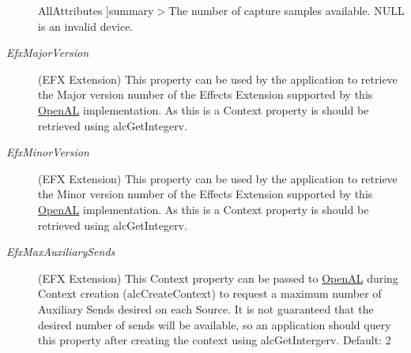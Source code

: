 \begin{Desc}
\begin{description}
{\hypertarget{namespace_open_t_k_1_1_audio_1_1_open_a_l_ae26e71360702946aac46d8980c00d350a7e49fcf09eba0bf5138522f269346d53}{All\-Attributes}\label{namespace_open_t_k_1_1_audio_1_1_open_a_l_ae26e71360702946aac46d8980c00d350a7e49fcf09eba0bf5138522f269346d53}
}]summary$>$The number of capture samples available. N\-U\-L\-L is an invalid device.\item[{\em 
\hypertarget{namespace_open_t_k_1_1_audio_1_1_open_a_l_ae26e71360702946aac46d8980c00d350a80eb100b1afb41869f94af4616ff48d5}{Efx\-Major\-Version}\label{namespace_open_t_k_1_1_audio_1_1_open_a_l_ae26e71360702946aac46d8980c00d350a80eb100b1afb41869f94af4616ff48d5}
}](E\-F\-X Extension) This property can be used by the application to retrieve the Major version number of the Effects Extension supported by this \hyperlink{namespace_open_t_k_1_1_audio_1_1_open_a_l}{Open\-A\-L} implementation. As this is a Context property is should be retrieved using alc\-Get\-Integerv.\item[{\em 
\hypertarget{namespace_open_t_k_1_1_audio_1_1_open_a_l_ae26e71360702946aac46d8980c00d350a95aa24ae90171f0a08032c90f0860f6d}{Efx\-Minor\-Version}\label{namespace_open_t_k_1_1_audio_1_1_open_a_l_ae26e71360702946aac46d8980c00d350a95aa24ae90171f0a08032c90f0860f6d}
}](E\-F\-X Extension) This property can be used by the application to retrieve the Minor version number of the Effects Extension supported by this \hyperlink{namespace_open_t_k_1_1_audio_1_1_open_a_l}{Open\-A\-L} implementation. As this is a Context property is should be retrieved using alc\-Get\-Integerv.\item[{\em 
\hypertarget{namespace_open_t_k_1_1_audio_1_1_open_a_l_ae26e71360702946aac46d8980c00d350a7ff17bb3868ebe884974e808eab3acf9}{Efx\-Max\-Auxiliary\-Sends}\label{namespace_open_t_k_1_1_audio_1_1_open_a_l_ae26e71360702946aac46d8980c00d350a7ff17bb3868ebe884974e808eab3acf9}
}](E\-F\-X Extension) This Context property can be passed to \hyperlink{namespace_open_t_k_1_1_audio_1_1_open_a_l}{Open\-A\-L} during Context creation (alc\-Create\-Context) to request a maximum number of Auxiliary Sends desired on each Source. It is not guaranteed that the desired number of sends will be available, so an application should query this property after creating the context using alc\-Get\-Intergerv. Default\-: 2\end{description}
\end{Desc}
